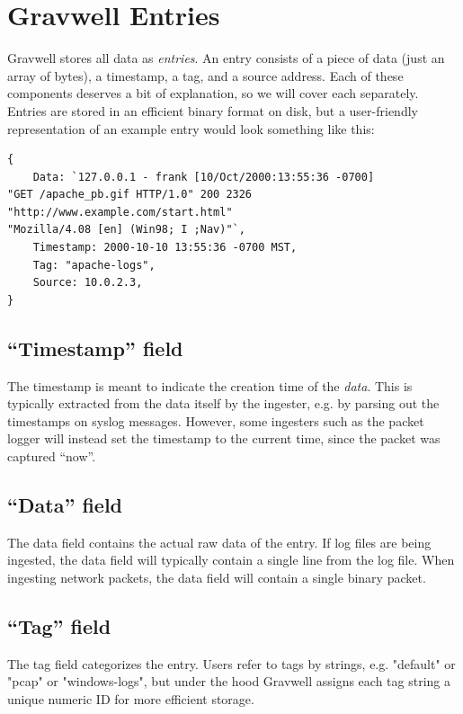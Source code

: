 \section{Gravwell Entries}

Gravwell stores all data as \emph{entries}. An entry consists of a piece of data (just an array of bytes), a timestamp, a tag, and a source address. Each of these components deserves a bit of explanation, so we will cover each separately. Entries are stored in an efficient binary format on disk, but a user-friendly representation of an example entry would look something like this:

\begin{Verbatim}[breaklines=true]
{
    Data: `127.0.0.1 - frank [10/Oct/2000:13:55:36 -0700] 
"GET /apache_pb.gif HTTP/1.0" 200 2326 "http://www.example.com/start.html" 
"Mozilla/4.08 [en] (Win98; I ;Nav)"`,
    Timestamp: 2000-10-10 13:55:36 -0700 MST,
    Tag: "apache-logs",
    Source: 10.0.2.3,
}
\end{Verbatim}

\subsection{``Timestamp'' field}

The timestamp is meant to indicate the creation time of the \emph{data}. This is typically extracted from the data itself by the ingester, e.g. by parsing out the timestamps on syslog messages. However, some ingesters such as the packet logger will instead set the timestamp to the current time, since the packet was captured ``now''.

\subsection{``Data'' field}

The data field contains the actual raw data of the entry. If log files are being ingested, the data field will typically contain a single line from the log file. When ingesting network packets, the data field will contain a single binary packet.

\subsection{``Tag'' field}

The tag field categorizes the entry. Users refer to tags by strings, e.g. "default" or "pcap" or "windows-logs", but under the hood Gravwell assigns each tag string a unique numeric ID for more efficient storage.

